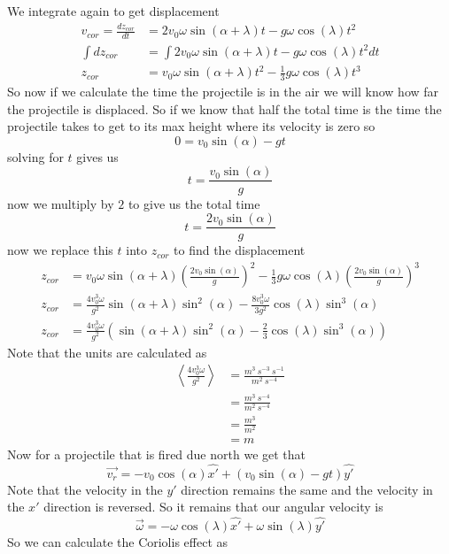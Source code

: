 \documentclass[11pt]{article}
\numberwithin{equation}{section}
\newcommand{\vecomg}{\vec{\omega}}
\begin{document}
We integrate again to get displacement
\begin{align*}
v_{cor} = \frac{dz_{cor}}{dt} &= 2v_0\omega\sin(\alpha+\lambda)t-g\omega\cos(\lambda)t^2\\
\int dz_{cor} &= \int2v_0\omega\sin(\alpha+\lambda)t-g\omega\cos(\lambda)t^2dt\\
z_{cor} &= v_0\omega\sin(\alpha+\lambda)t^2-\frac{1}{3}g\omega\cos(\lambda)t^3
\end{align*}
So now if we calculate the time the projectile is in the air we will know how far the projectile is displaced. So if we know that half the total time is the time the projectile takes to get to its max height where its velocity is zero so
$$0 = v_0\sin(\alpha)-gt$$
solving for $t$ gives us
$$t = \frac{v_0\sin(\alpha)}{g}$$
now we multiply by $2$ to give us the total time
$$t = \frac{2v_0\sin(\alpha)}{g}$$
now we replace this $t$ into $z_{cor}$ to find the displacement 
\begin{align*}
z_{cor} &= v_0\omega\sin(\alpha+\lambda)\left(\frac{2v_0\sin(\alpha)}{g}\right)^2-\frac{1}{3}g\omega\cos(\lambda)\left(\frac{2v_0\sin(\alpha)}{g}\right)^3\\
z_{cor} &= \frac{4v_0^3\omega}{g^2}\sin(\alpha+\lambda)\sin^2(\alpha)-\frac{8v_0^3\omega}{3g^2}\cos(\lambda)\sin^3(\alpha)\\
z_{cor} &= \frac{4v_0^3\omega}{g^2}\left(\sin(\alpha+\lambda)\sin^2(\alpha)-\frac{2}{3}\cos(\lambda)\sin^3(\alpha)\right)
\end{align*}
Note that the units are calculated as
\begin{align*}
\left<\frac{4v_0^3\omega}{g^2}\right> &= \frac{m^3\ s^{-3}\ s^{-1}}{m^2\ s^{-4}}\\
&= \frac{m^3\ s^{-4}}{m^2\ s^{-4}}\\
&= \frac{m^3}{m^2}\\
&= m
\end{align*}
Now for a projectile that is fired due north we get that 
$$\vec{v_r} = -v_0\cos(\alpha)\hat{x'}+(v_0\sin(\alpha)-gt)\hat{y'}$$
Note that the velocity in the $y'$ direction remains the same and the velocity in the $x'$ direction is reversed. So it remains that our angular velocity is
$$\vecomg = -\omega\cos(\lambda)\hat{x'} + \omega\sin(\lambda)\hat{y'}$$
So we can calculate the Coriolis effect as
\end{document}
